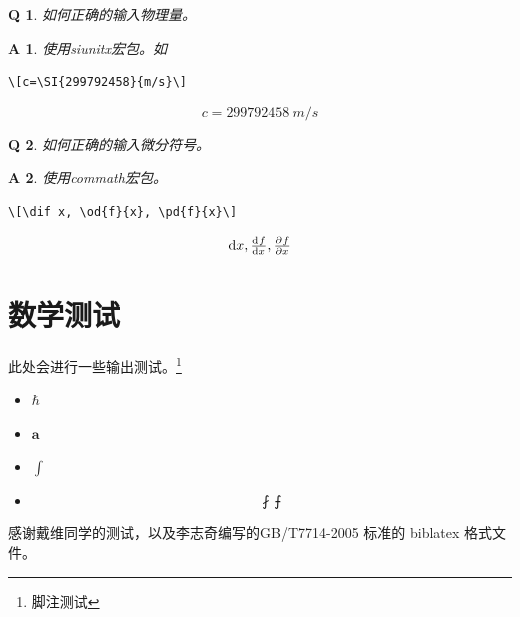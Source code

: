 \documentclass{LZU}
\newcommand{\bvec}[1]{\symbf{#1}}
\newcommand{\package}[1]{{\sffamily #1}}
\newtheorem*{answer}{A}
\newtheorem{question}{Q}
\begin{document}
\begin{question}
    如何正确的输入物理量。
\end{question}
\begin{answer}
    使用\package{siunitx}宏包。如
\begin{verbatim}
\[c=\SI{299792458}{m/s}\]
\end{verbatim}
    \[c=\SI{299792458}{m/s}\]
\end{answer}
\begin{question}
    如何正确的输入微分符号。
\end{question}
\begin{answer}
    使用\package{commath}宏包。
\begin{verbatim}
\[\dif x, \od{f}{x}, \pd{f}{x}\]
\end{verbatim}
    \[\dif x, \od{f}{x}, \pd{f}{x}\]
\end{answer}
\section{数学测试}
此处会进行一些输出测试。\footnote{脚注测试}
\begin{itemize}
    \item $\hbar$
    \item $\bvec{a}$
    \item $\int$
    \item \[\fint\intbar\]
\end{itemize}
\Thanks
感谢戴维同学的测试，以及李志奇编写的GB/T7714-2005 标准的 biblatex 格式文件。
\Grade
\end{document}
